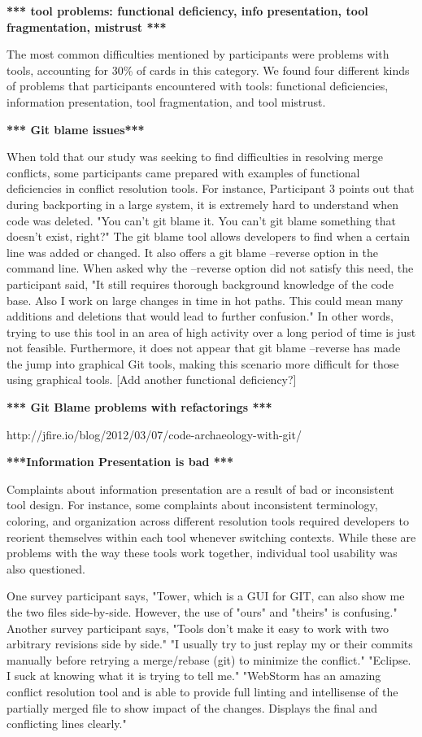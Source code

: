 \documentclass[conference]{IEEEtran}
\begin{document}
\textbf{*** tool problems: functional deficiency, info presentation, tool fragmentation,  mistrust ***}

The most common difficulties mentioned by participants were problems with tools, accounting for 30\% of cards in this category. We found four different kinds of problems that participants encountered with tools: functional deficiencies, information presentation, tool fragmentation, and tool mistrust. 

\textbf{*** Git blame issues***}

When told that our study was seeking to find difficulties in resolving merge conflicts, some participants came prepared with examples of functional deficiencies in conflict resolution tools. For instance, Participant 3 points out that during backporting in a large system, it is extremely hard to understand when code was deleted. "You can't git blame it. You can't git blame something that doesn't exist, right?" 
The git blame tool allows developers to find when a certain line was added or changed. It also offers a git blame --reverse option in the command line. When asked why the --reverse option did not satisfy this need, the participant said, "It still requires thorough background knowledge of the code base. Also I work on large changes in time in hot paths. This could mean many additions and deletions that would lead to further confusion." In other words, trying to use this tool in an area of high activity over a long period of time is just not feasible. Furthermore, it does not appear that git blame --reverse has made the jump into graphical Git tools, making this scenario more difficult for those using graphical tools. [Add another functional deficiency?]

\textbf{*** Git Blame problems with refactorings ***}

http://jfire.io/blog/2012/03/07/code-archaeology-with-git/

\textbf{***Information Presentation is bad ***}

Complaints about information presentation are a result of bad or inconsistent tool design. For instance, some complaints about inconsistent terminology, coloring, and organization across different resolution tools required developers to reorient themselves within each tool whenever switching contexts. While these are problems with the way these tools work together, individual tool usability was also questioned.

One survey participant says, "Tower, which is a GUI for GIT, can also show me the two files side-by-side. However, the use of "ours" and "theirs" is confusing."
Another survey participant says, "Tools don't make it easy to work with two arbitrary revisions side by side."
"I usually try to just replay my or their commits manually before retrying a merge/rebase (git) to minimize the conflict."
"Eclipse. I suck at knowing what it is trying to tell me."
"WebStorm has an amazing conflict resolution tool and is able to provide full linting and intellisense of the partially merged file to show impact of the changes. Displays the final and conflicting lines clearly."
\end{document}
